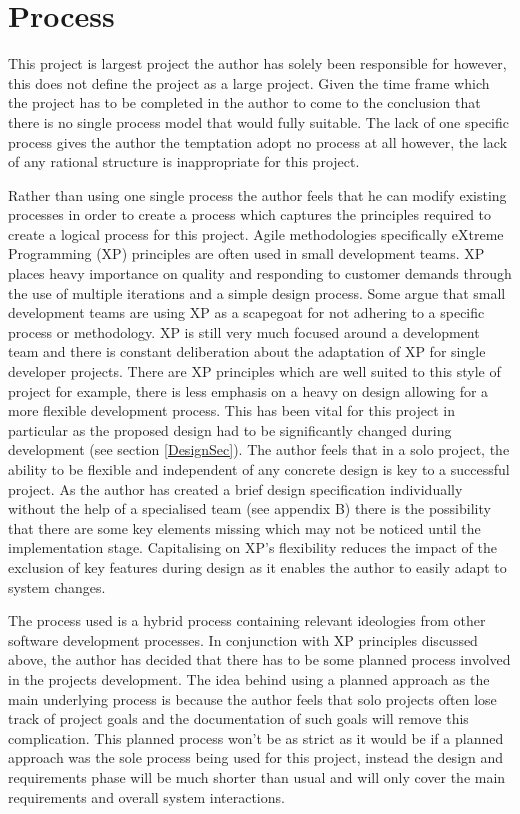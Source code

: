 \chapter{Process}
\label{processSec}
This project is largest project the author has solely been responsible for however, this does not define the project as a large project. Given the time frame which the project has to be completed in the author to come to the conclusion that there is no single process model that would fully suitable. The lack of one specific process gives the author the temptation adopt no process at all however, the lack of any rational structure is inappropriate for this project.

Rather than using one single process the author feels that he can modify existing processes in order to create a process which captures the principles required to create a logical process for this project. Agile methodologies specifically eXtreme Programming (XP) principles are often used in small development teams. XP places heavy importance on quality and responding to customer demands through the use of multiple iterations and a simple design process. Some argue that small development teams are using XP as a scapegoat for not adhering to a specific process or methodology. XP is still very much focused around a development team and there is constant deliberation about the adaptation of XP for single developer projects\cite{XP:forone}. There are XP principles which are well suited to this style of project for example, there is less emphasis on a heavy on design allowing for a more flexible development process. This has been vital for this project in particular as the proposed design had to be significantly changed during development (see section \ref{DesignSec}). The author feels that in a solo project, the ability to be flexible and independent of any concrete design is key to a successful project. As the author has created a brief design specification individually without the help of a specialised team (see appendix B) there is the possibility that there are some key elements missing which may not be noticed until the implementation stage. Capitalising on XP's flexibility reduces the impact of the exclusion of key features during design as it enables the author to easily adapt to system changes. 

The process used is a hybrid process containing relevant ideologies from other software development processes. In conjunction with XP principles discussed above, the author has decided that there has to be some planned process involved in the projects development. The idea behind using a planned approach as the main underlying process is because the author feels that solo projects often lose track of project goals and the documentation of such goals will remove this complication. This planned process won’t be as strict as it would be if a planned approach was the sole process being used for this project, instead the design and requirements phase will be much shorter than usual and will only cover the main requirements and overall system interactions. 

